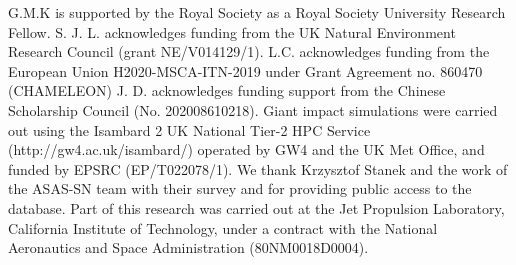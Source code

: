 \documentclass[sn-nature]{sn-jnl}%
\begin{document}







\clearpage


G.M.K is supported by the Royal Society as a Royal Society University Research Fellow.
%
S. J. L. acknowledges funding from the UK Natural Environment Research Council (grant NE/V014129/1).
%
L.C. acknowledges funding from the European Union H2020-MSCA-ITN-2019 under Grant Agreement no. 860470 (CHAMELEON)
%
J. D. acknowledges funding support from the Chinese Scholarship Council (No. 202008610218). Giant impact simulations were carried out using the Isambard 2 UK National Tier-2 HPC Service (http://gw4.ac.uk/isambard/) operated by GW4 and the UK Met Office, and funded by EPSRC (EP/T022078/1).
%
We thank Krzysztof Stanek and the work of the ASAS-SN team with their survey and for providing public access to the database.
%
Part of this research was carried out at the Jet Propulsion Laboratory, California Institute of Technology, under a contract with the National Aeronautics and Space Administration (80NM0018D0004).
\end{document}
